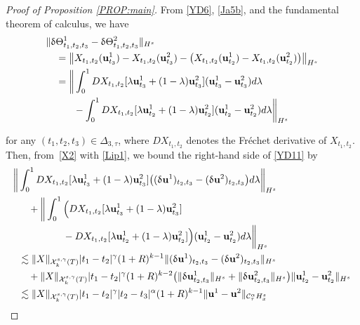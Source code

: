 \documentclass[letterpaper, 11pt,  reqno]{amsart}
\newcommand{\1}{\hspace{0.5mm}\text{I}\hspace{0.5mm}}
\newcommand{\noi}{\noindent}
\newcommand{\CC}{\mathcal{C}}
\newcommand{\al}{\alpha}
\newcommand{\updl}{\updelta}
\newcommand{\Dl}{\Delta}
\newcommand{\g}{\gamma}
\newcommand{\ld}{\lambda}
\newcommand{\les}{\lesssim}
\newcommand{\cX}{\mathcal{X}}
\newcommand{\uu}{\mathbf{u}}
\newcommand{\Ta}{\Theta}
\numberwithin{equation}{section}
\numberwithin{theorem}{section}
\begin{document}
\begin{proof}[Proof of Proposition \ref{PROP:main}]
\noi
From \eqref{YD6}, 
\eqref{Ja5b}, 
and the fundamental theorem of calculus, 
we have 
\begin{align}
\label{YD11}
\begin{aligned}
 \|  \updl & \Theta^1_{t_1, t_2, t_3} - \updl \Ta^2_{t_1,t_2,t_3}\|_{H^s}\\
& = 
\big\|
X_{t_1,t_2}(\uu^1_{t_3}) - X_{t_1,t_2}(\uu^2 _{t_3})
-\big(X_{t_1,t_2}(\uu^1_{t_2}) - X_{t_1,t_2}(\uu^2_{t_2})\big)\big\|_{H^s}
\\
& =
\bigg\| 
\int^1_0 DX_{t_1,t_2}[\ld \uu^1_{t_3} + (1-\ld)\uu^2 _{t_3}]
(\uu^1_{t_3} - \uu^2_{t_3}) d \ld 
\\
& \hphantom{XX}
- \int^1_0 DX_{t_1,t_2}[\ld \uu^1_{t_2} + (1-\ld)\uu^2 _{t_2}]
 (\uu^1_{t_2} - \uu^2 _{t_2}) d \ld
\bigg\|_{H^s}
\end{aligned}
\end{align}


\noi
for any  $(t_1,t_2,t_3)\in \Dl_{3,\tau}$, where
$D X_{t_1, t_2}$ denotes the 
Fr\'echet derivative of $X_{t_1, t_2}$.
Then, from~\eqref{X2} with \eqref{Lip1}, 
we bound the right-hand side of \eqref{YD11}
by 
\begin{align}
\bigg\| & 
\int^1_0 DX_{t_1,t_2}[\ld \uu^1_{t_3} + (1-\ld)\uu^2 _{t_3}]
\big((\updl \uu^1)_{t_2,t_3} - (\updl \uu^2 )_{t_2,t_3}\big) d \ld \bigg\|_{H^s}
\notag \\
& \quad
+ \bigg\|\int^1_0 
\Big(DX_{t_1,t_2}[\ld \uu^1_{t_3} + (1-\ld)\uu^2 _{t_3}]\notag  \\
& \hphantom{XXXXX}
-  DX_{t_1,t_2}[\ld \uu^1_{t_2} + (1-\ld)\uu^2 _{t_2}]\Big)
 (\uu^1_{t_2} - \uu^2 _{t_2}) d \ld\bigg\|_{H^s}
\label{YD12} \\
& \les
\|X\|_{\cX^{s, \g}_k(T)} |t_1-t_2|^\g 
(1+R)^{k-1}
\|(\updl \uu^1)_{t_2,t_3} - (\updl \uu^2 )_{t_2,t_3}\|_{H^s}
\notag \\
& \quad +
\|X\|_{\cX^{s, \g}_k(T)} |t_1-t_2|^\g 
(1+R)^{k-2}
\big(\|\updl \uu^1_{t_2, t_3}\|_{H^s}+ \|\updl \uu^2_{t_2, t_3}\|_{H^s}\big)
\|\uu^1_{t_2} - \uu^2 _{t_2}\|_{H^s} \notag \\
& \les 
\|X\|_{\cX^{s, \g}_k(T)} |t_1-t_2|^\g 
|t_2 - t_3|^{\al} (1+R)^{k-1}\|\uu^1- \uu^2 \|_{\CC^\al _\tau H^s_x}
\notag 
\end{align}


\end{proof}
\end{document}

